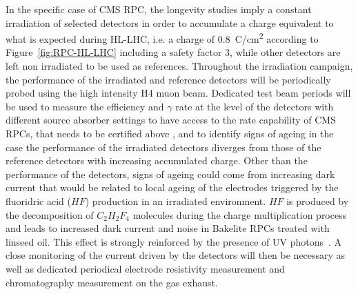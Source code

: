 	In the specific case of CMS RPC, the longevity studies imply a constant irradiation of selected detectors in order to accumulate a charge equivalent to what is expected during HL-LHC, i.e. a charge of \SI{0.8}{C/cm^2} according to Figure~\ref{fig:RPC-HL-LHC} including a safety factor 3, while other detectors are left non irradiated to be used as references. Throughout the irradiation campaign, the performance of the irradiated and reference detectors will be periodically probed using the high intensity H4 muon beam. Dedicated test beam periods will be used to measure the efficiency and $\gamma$ rate at the level of the detectors with different source absorber settings to have access to the rate capability of CMS RPCs, that needs to be certified above , and to identify signs of ageing in the case the performance of the irradiated detectors diverges from those of the reference detectors with increasing accumulated charge. Other than the performance of the detectors, signs of ageing could come from increasing dark current that would be related to local ageing of the electrodes triggered by the fluoridric acid ($HF$) production in an irradiated environment. $HF$ is produced by the decomposition of $C_2H_2F_4$ molecules during the charge multiplication process and leads to increased dark current and noise in Bakelite RPCs treated with linseed oil. This effect is strongly reinforced by the presence of UV photons~\cite{GUIDA2008,BELLINI2008}. A close monitoring of the current driven by the detectors will then be necessary as well as dedicated periodical electrode resistivity measurement and chromatography measurement on the gas exhaust.
	
